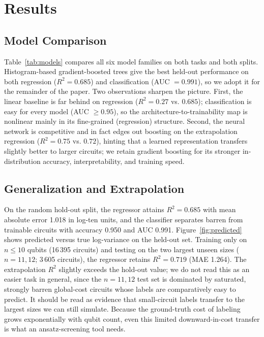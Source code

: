 \documentclass{ieeeaccess}
\newcommand{\RsqHold}{0.685}
\newcommand{\MaeHold}{1.018}
\newcommand{\AccHold}{0.950}
\newcommand{\AucHold}{0.991}
\newcommand{\ExtrapCut}{10}
\newcommand{\RsqExtrap}{0.719}
\newcommand{\MaeExtrap}{1.264}
\newcommand{\ExtrapTrainRows}{16\,395}
\newcommand{\ExtrapTestRows}{3\,605}
\begin{document}
\section{Results}
\subsection{Model Comparison}
Table~\ref{tab:models} compares all six model families on both tasks and both
splits. Histogram-based gradient-boosted trees give the best held-out performance
on both regression ($R^2=\RsqHold{}$) and classification (AUC $=\AucHold{}$), so we
adopt it for the remainder of the paper. Two observations sharpen the picture.
First, the linear baseline is far behind on regression ($R^2=0.27$ vs.
$\RsqHold{}$); classification is easy for every model (AUC $\ge 0.95$), so the
architecture-to-trainability map is nonlinear mainly in its fine-grained
(regression) structure. Second, the neural network is competitive and in fact edges out boosting
on the extrapolation regression ($R^2=0.75$ vs. $0.72$), hinting that a learned
representation transfers slightly better to larger circuits; we retain gradient
boosting for its stronger in-distribution accuracy, interpretability, and training
speed.

\begin{table}[!t]
\caption{Model comparison across both tasks and both evaluation splits. Best
hold-out result in bold.}
\label{tab:models}
\centering

\end{table}

\subsection{Generalization and Extrapolation}
On the random hold-out split, the regressor attains $R^2=\RsqHold{}$ with mean
absolute error \MaeHold{} in log-ten units, and the classifier separates barren
from trainable circuits with accuracy \AccHold{} and AUC \AucHold{}.
Figure~\ref{fig:predicted} shows predicted versus true log-variance on the held-out
set. Training only on $n\le\ExtrapCut{}$ qubits (\ExtrapTrainRows{} circuits) and
testing on the two largest unseen sizes ($n=11,12$; \ExtrapTestRows{} circuits),
the regressor retains $R^2=\RsqExtrap{}$ (MAE \MaeExtrap{}). The extrapolation
$R^2$ slightly exceeds the hold-out value; we do not read this as an easier task in
general, since the $n=11,12$ test set is dominated by saturated, strongly barren
global-cost circuits whose labels are comparatively easy to predict. It should be
read as evidence that small-circuit labels transfer to the largest sizes we can
still simulate. Because the ground-truth cost of labeling grows exponentially with
qubit count, even this limited downward-in-cost transfer is what an ansatz-screening
tool needs.
\end{document}
